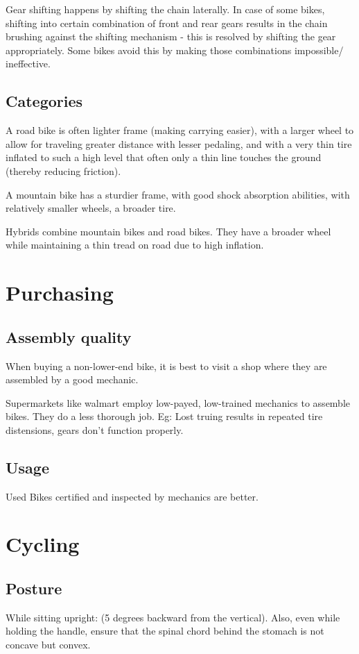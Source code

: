 \documentclass[oneside, article]{memoir}
\begin{document}
Gear shifting happens by shifting the chain laterally. In case of some bikes, shifting into certain combination of front and rear gears results in the chain brushing against the shifting mechanism - this is resolved by shifting the gear appropriately. Some bikes avoid this by making those combinations impossible/ ineffective.

\section{Categories}
A road bike is often lighter frame (making carrying easier), with a larger wheel to allow for traveling greater distance with lesser pedaling, and with a very thin tire inflated to such a high level that often only a thin line touches the ground (thereby reducing friction).

A mountain bike has a sturdier frame, with good shock absorption abilities, with relatively smaller wheels, a broader tire.

Hybrids combine mountain bikes and road bikes. They have a broader wheel while maintaining a thin tread on road due to high inflation.

\chapter{Purchasing}
\section{Assembly quality}
When buying a non-lower-end bike, it is best to visit a shop where they are assembled by a good mechanic.

Supermarkets like walmart employ low-payed, low-trained mechanics to assemble bikes. They do a less thorough job. Eg: Lost truing results in repeated tire distensions, gears don't function properly.

\section{Usage}
Used Bikes certified and inspected by mechanics are better.

\chapter{Cycling}
\section{Posture}
While sitting upright: (5 degrees backward from the vertical). Also, even while holding the handle, ensure that the spinal chord behind the stomach is not concave but convex. 
\end{document}
